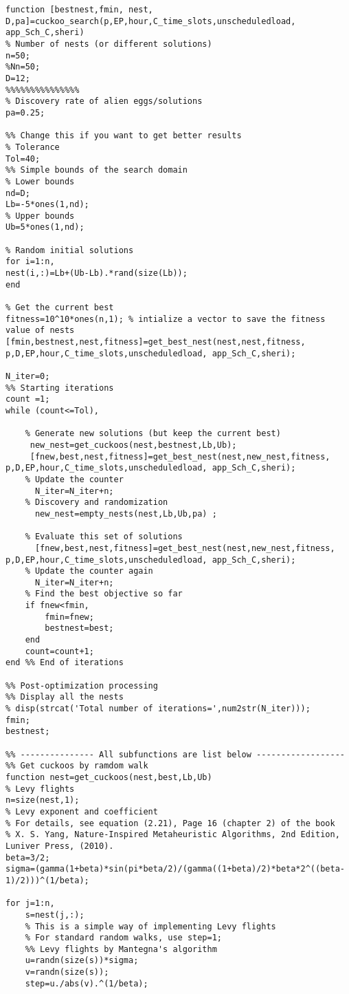\begin{linenumbers}
\begin{lstlisting}
function [bestnest,fmin, nest, D,pa]=cuckoo_search(p,EP,hour,C_time_slots,unscheduledload, app_Sch_C,sheri)
% Number of nests (or different solutions)
n=50;
%Nn=50;
D=12;
%%%%%%%%%%%%%%%
% Discovery rate of alien eggs/solutions
pa=0.25;

%% Change this if you want to get better results
% Tolerance
Tol=40;
%% Simple bounds of the search domain
% Lower bounds
nd=D;
Lb=-5*ones(1,nd);
% Upper bounds
Ub=5*ones(1,nd);

% Random initial solutions
for i=1:n,
nest(i,:)=Lb+(Ub-Lb).*rand(size(Lb));
end

% Get the current best
fitness=10^10*ones(n,1); % intialize a vector to save the fitness value of nests
[fmin,bestnest,nest,fitness]=get_best_nest(nest,nest,fitness, p,D,EP,hour,C_time_slots,unscheduledload, app_Sch_C,sheri);

N_iter=0;
%% Starting iterations
count =1;
while (count<=Tol),

    % Generate new solutions (but keep the current best)
     new_nest=get_cuckoos(nest,bestnest,Lb,Ub);
     [fnew,best,nest,fitness]=get_best_nest(nest,new_nest,fitness, p,D,EP,hour,C_time_slots,unscheduledload, app_Sch_C,sheri);
    % Update the counter
      N_iter=N_iter+n;
    % Discovery and randomization
      new_nest=empty_nests(nest,Lb,Ub,pa) ;

    % Evaluate this set of solutions
      [fnew,best,nest,fitness]=get_best_nest(nest,new_nest,fitness, p,D,EP,hour,C_time_slots,unscheduledload, app_Sch_C,sheri);
    % Update the counter again
      N_iter=N_iter+n;
    % Find the best objective so far
    if fnew<fmin,
        fmin=fnew;
        bestnest=best;
    end
    count=count+1;
end %% End of iterations

%% Post-optimization processing
%% Display all the nests
% disp(strcat('Total number of iterations=',num2str(N_iter)));
fmin;
bestnest;

%% --------------- All subfunctions are list below ------------------
%% Get cuckoos by ramdom walk
function nest=get_cuckoos(nest,best,Lb,Ub)
% Levy flights
n=size(nest,1);
% Levy exponent and coefficient
% For details, see equation (2.21), Page 16 (chapter 2) of the book
% X. S. Yang, Nature-Inspired Metaheuristic Algorithms, 2nd Edition, Luniver Press, (2010).
beta=3/2;
sigma=(gamma(1+beta)*sin(pi*beta/2)/(gamma((1+beta)/2)*beta*2^((beta-1)/2)))^(1/beta);

for j=1:n,
    s=nest(j,:);
    % This is a simple way of implementing Levy flights
    % For standard random walks, use step=1;
    %% Levy flights by Mantegna's algorithm
    u=randn(size(s))*sigma;
    v=randn(size(s));
    step=u./abs(v).^(1/beta);


\end{lstlisting}
\end{linenumbers}

